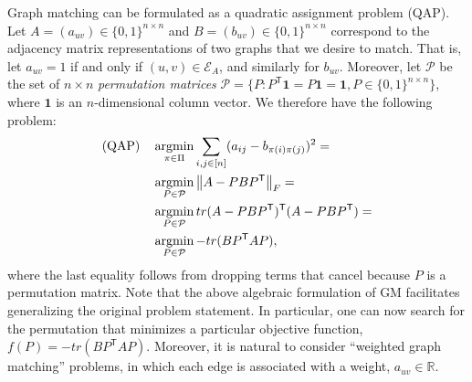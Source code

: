 \documentclass[11pt]{article}
\providecommand{\norm}[1]{\left \lVert#1 \right  \rVert}
\newcommand{\argmin}{\operatornamewithlimits{argmin}}
\newcommand{\T}{^{\ensuremath{\mathsf{T}}}}           %
\providecommand{\mc}[1]{\mathcal{#1}}
\providecommand{\mb}[1]{\boldsymbol{#1}}
\newcommand{\PmcP}{P \in \mc{P}}
\newcommand{\Real}{\mathbb{R}}
\begin{document}
Graph matching can be formulated as a quadratic assignment problem (QAP).  Let $A=(a_{uv}) \in \{0,1\}^{n \times n}$ and $B=(b_{uv}) \in \{0,1\}^{n \times n}$ correspond to the adjacency matrix representations of two graphs that we desire to match. That is, let $a_{uv}=1$ if and only if $(u,v) \in \mc{E}_A$, and similarly for $b_{uv}$.  Moreover, let $\mc{P}$ be the set of  $n \times n$ \emph{permutation matrices}  $\mc{P}=\{P : P\T \mb{1} = P \mb{1} = \mb{1}, P \in \{0,1\}^{n \times n}\}$, where $\mb{1}$ is an $n$-dimensional column vector.
% 
We therefore have the following problem:  
\begin{subequations} \label{eq:GM}
\begin{align}
\text{(QAP)} \quad 	&\argmin_{\pi \in \Pi} \sum_{i,j \in [n]} (a_{ij} - b_{\pi(i) \pi(j)})^2= \\
	&\argmin_{\PmcP} \norm{A - PBP\T}_F = \\
	&\argmin_{\PmcP} tr(A - PBP\T)\T (A - PBP\T) = \label{eq:trQAP2} \\
	&\argmin_{\PmcP} - tr(B P\T AP), \label{eq:trQAP} %
\end{align}
\end{subequations}
where the last equality follows from dropping terms that cancel because $P$ is a permutation matrix. Note that the above algebraic formulation of GM facilitates generalizing the original problem statement. In particular, one can now search for the permutation that minimizes a particular objective function, $f(P)=- tr(B P\T AP)$.  Moreover, it is natural to consider ``weighted graph matching''  problems, in which each edge is associated with a weight, $a_{uv} \in \Real$.  
\end{document}
